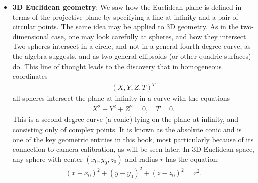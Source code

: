 \documentclass{report}
\begin{document}
\begin{itemize}
            \bigbreak \noindent 
            Next, you pick two specific complex points on that line at infinity: \(I = (1, i, 0)\) and \(J = (1, -i, 0)\), known as the circular points. If you restrict your transformations even further so that they must map the pair \(\{I, J\}\) to itself, you eliminate all stretching and shearing. The only transformations left are rotations, translations, reflections, and uniform scaling—the exact similarity transformations of standard Euclidean geometry.
            \bigbreak \noindent 
            \textbf{Note:} Shearing in geometry refers to sliding motion.
            \bigbreak \noindent 
            Intuitively, it happens because the circular points are the "DNA of roundness," and stretching or shearing is literally the act of destroying roundness. Every circle passes through the two circular points \(I\) and \(J\). 
        \item \textbf{3D Euclidean geometry}: We saw how the Euclidean plane is defined in terms of the projective plane by specifying a line at infinity and a pair of circular points. The same idea may be applied to 3D geometry. As in the two-dimensional case, one may look carefully at spheres, and how they intersect. Two spheres intersect in a circle, and not in a general fourth-degree curve, as the algebra suggests, and as two general ellipsoids (or other quadric surfaces) do. 
            \bigbreak \noindent 
            This line of thought leads to the discovery that in homogeneous coordinates
            \begin{align*}
                (X,Y,Z,T)^{T} 
            \end{align*}
            all spheres intersect the plane at infinity in a curve with the equations
            \begin{align*}
                X^{2} + Y^{2} + Z^{2} = 0,\quad T = 0
            .\end{align*}
            This is a second-degree curve (a conic) lying on the plane at infinity, and consisting only of complex points. It is known as the absolute conic and is one of the key geometric entities in this book, most particularly because of its connection to camera calibration, as will be seen later.
            \bigbreak \noindent 
            In 3D Euclidean space, any sphere with center \((x_0, y_0, z_0)\) and radius \(r\) has the equation:
            \begin{align*}
                (x-x_{0})^{2} + (y-y_{0})^{2} + (z-z_{0})^{2} = r^{2}                
            .\end{align*}

\end{itemize}
\end{document}
